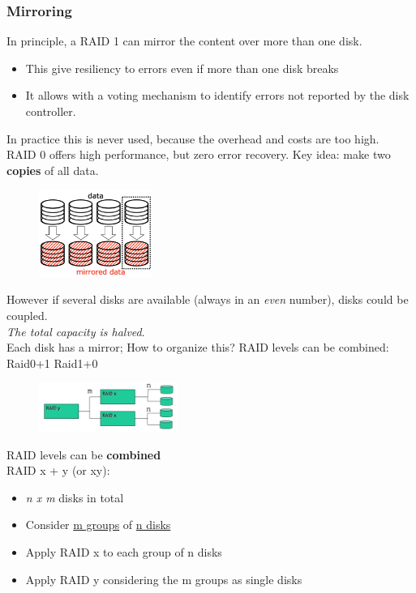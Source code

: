 \documentclass[10pt, oneside]{article}
\begin{document}
\subsubsection*{Mirroring}
\begin{multicols}{2}
    In principle, a RAID 1 can mirror the content over more than one disk.\begin{itemize}
        \item This give resiliency to errors even if more than one disk breaks
        \item It allows with a voting mechanism to identify errors not reported by the disk controller.
    \end{itemize}
    In practice this is never used, because the overhead and costs are too high.\\RAID 0 offers high performance, but zero error recovery. Key idea: make two {\bf copies} of all data.
    \columnbreak
    \begin{figure}[H]
        \begin{center}
        \includegraphics[width=0.33\textwidth]{img/img67.png}
        \end{center}
    \end{figure}
\end{multicols}However if several disks are available (always in an {\sl even} number), disks could be coupled.\\{\sl The total capacity is halved}.\\Each disk has a mirror; How to organize this? RAID levels can be combined: Raid0+1   Raid1+0
\newpage
\begin{multicols}{2}
    \begin{figure}[H]
        \begin{center}
        \includegraphics[width=0.4\textwidth]{img/img68.png}
        \end{center}
    \end{figure}
    \columnbreak
    RAID levels can be {\bf combined}\\RAID x + y (or xy):\begin{itemize}
        \item {\sl n x m} disks in total
        \item Consider \underline{m groups} of \underline{n disks}
        \item Apply RAID x to each group of n disks
        \item Apply RAID y considering the m groups as single disks
    \end{itemize}
\end{multicols}
\end{document}
